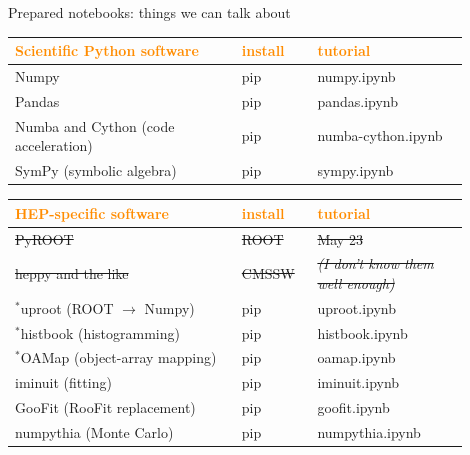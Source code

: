 \documentclass[aspectratio=169]{beamer}
\begin{document}
\begin{frame}{Prepared notebooks: things we can talk about}
\vspace{0.3 cm}
\renewcommand{\arraystretch}{1.1}

\begin{tabular}{p{0.45\linewidth} >{\centering\arraybackslash}p{0.15\linewidth} p{0.3\linewidth}}
\textcolor{darkorange}{\bf Scientific Python software} & \textcolor{darkorange}{\bf install} & \textcolor{darkorange}{\bf tutorial} \\\hline
Numpy & pip & numpy.ipynb \\
Pandas & pip & pandas.ipynb \\
Numba and Cython (code acceleration) & pip & numba-cython.ipynb \\
SymPy (symbolic algebra) & pip & sympy.ipynb \\
\end{tabular}

\vspace{0.25 cm}

\begin{tabular}{p{0.45\linewidth} >{\centering\arraybackslash}p{0.15\linewidth} p{0.3\linewidth}}
\textcolor{darkorange}{\bf HEP-specific software} & \textcolor{darkorange}{\bf install} & \textcolor{darkorange}{\bf tutorial} \\\hline
\sout{PyROOT} & \sout{ROOT} & \sout{May 23} \\
\sout{heppy and the like} & \sout{CMSSW} & {\it\scriptsize\sout{(I don't know them well enough)}} \\
$^*$uproot (ROOT $\to$ Numpy) & pip & uproot.ipynb \\
$^*$histbook (histogramming) & pip & histbook.ipynb \\
$^*$OAMap (object-array mapping) & pip & oamap.ipynb \\
iminuit (fitting) & pip & iminuit.ipynb \\
GooFit (RooFit replacement) & pip & goofit.ipynb \\
numpythia (Monte Carlo) & pip & numpythia.ipynb \\
\end{tabular}
\end{frame}
\end{document}
